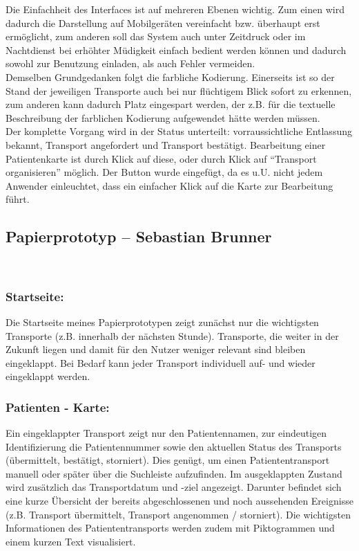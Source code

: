 \documentclass[a4paper, ngerman, 12pt]{scrartcl}
\begin{document}
Die Einfachheit des Interfaces ist auf mehreren Ebenen wichtig. Zum einen wird dadurch die Darstellung auf Mobilgeräten vereinfacht bzw. überhaupt erst ermöglicht, zum anderen soll das System auch unter Zeitdruck oder im Nachtdienst bei erhöhter Müdigkeit einfach bedient werden können und dadurch sowohl zur Benutzung einladen, als auch Fehler vermeiden.\\

Demselben Grundgedanken folgt die farbliche Kodierung. Einerseits ist so der Stand der jeweiligen Transporte auch bei nur flüchtigem Blick sofort zu erkennen, zum anderen kann dadurch Platz eingespart werden, der z.B. für die textuelle Beschreibung der farblichen Kodierung aufgewendet hätte werden müssen.\\
 
Der komplette Vorgang wird in der Status unterteilt: vorraussichtliche Entlassung bekannt, Transport angefordert und Transport bestätigt. Bearbeitung einer Patientenkarte ist durch Klick auf diese, oder durch Klick auf “Transport organisieren” möglich. Der Button wurde eingefügt, da es u.U. nicht jedem Anwender einleuchtet, dass ein einfacher Klick auf die Karte zur Bearbeitung führt.

\subsection{Papierprototyp – Sebastian Brunner}
\begin{minipage}{\textwidth}
	\centering
	
	\label{img:brunner}
\end{minipage}\\[0.5em]
\subsubsection*{Startseite:}
Die Startseite meines Papierprototypen zeigt zunächst nur die wichtigsten Transporte (z.B. innerhalb der nächsten Stunde). Transporte, die weiter in der Zukunft liegen und damit für den Nutzer weniger relevant sind bleiben eingeklappt. Bei Bedarf kann jeder Transport individuell auf- und wieder eingeklappt werden.
\subsubsection*{Patienten - Karte:}
Ein eingeklappter Transport zeigt nur den Patientennamen, zur eindeutigen Identifizierung die Patientennummer sowie den aktuellen Status des Transports (übermittelt, bestätigt, storniert). Dies genügt, um einen Patiententransport manuell oder später über die Suchleiste aufzufinden. Im ausgeklappten Zustand wird zusätzlich das Transportdatum und -ziel angezeigt. Darunter befindet sich eine kurze Übersicht der bereits abgeschlossenen und noch aussehenden Ereignisse (z.B. Transport übermittelt, Transport angenommen / storniert). Die wichtigsten Informationen des Patiententransports werden zudem mit Piktogrammen und einem kurzen Text visualisiert.
\end{document}
